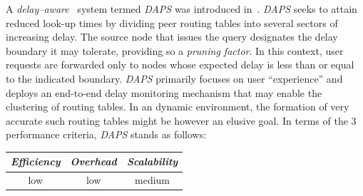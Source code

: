 A \emph{delay--aware} \p\ system termed {\sl DAPS} 
was introduced in~\cite{ZL2005}.
{\sl DAPS}  seeks to attain reduced look-up times by dividing 
peer routing tables into several sectors of increasing delay. 
The source node that issues the query designates the delay 
boundary it may tolerate, providing so a \emph{pruning factor}.
In this context, user requests are forwarded only to 
nodes whose expected delay is less than or equal to the indicated boundary. 
{\sl DAPS} primarily focuses on user ``experience'' and deploys an
end-to-end delay monitoring mechanism that  may enable
the clustering of routing tables. 
In an dynamic environment, the formation 
of very accurate such routing tables might be however an elusive goal.
In terms of the $3$ performance criteria, {\sl DAPS} stands as follows:
\begin{center}
{\footnotesize
\begin{tabular}{ccc}
\emph{Efficiency} & \emph{Overhead} & \emph{Scalability} \\
\hline
low &
low &
%
medium
\end{tabular}
}
\end{center}


